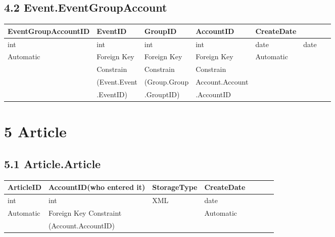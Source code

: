 \documentclass[12pt,fleqn]{article}
\begin{document}
\subsection*{4.2 Event.EventGroupAccount }
\begin{table}[htbp]
\centering
\footnotesize
\label{DB changes}
    \begin{tabular}{|l|l|l|l|l|l|l|} 
        \hline
        EventGroupAccountID & EventID & GroupID & AccountID  &  CreateDate & ~\\ \hline
        int & int & int & int & date & date & ~\\ \hline
        Automatic & Foreign Key & Foreign Key &  Foreign Key  &  Automatic & ~ \\
        ~ & Constrain & Constrain &  Constrain & ~  & ~  & ~ \\  
        ~ &  (Event.Event & (Group.Group & Account.Account  & ~ & ~ & ~ \\ 
        ~ &  .EventID) & .GrouptID) & .AccountID  & ~ & ~ & ~ \\ 
        \hline  
    \end{tabular}
\end{table}
\FloatBarrier
\newpage
\section* {5 Article}
\subsection*{5.1 Article.Article}
\begin{table}[htbp]
\centering
\footnotesize
\label{DB changes}
    \begin{tabular}{|l|l|l|l|l|l|l|} 
        \hline
        ArticleID & AccountID(who entered it) & StorageType & CreateDate & ~\\ \hline
        int & int & XML & date & ~\\ \hline
        Automatic & Foreign Key Constraint & ~ &  Automatic & ~ \\
        ~ & (Account.AccountID) & ~ & ~ & ~ \\
        \hline  
    \end{tabular}
\end{table}
\FloatBarrier
\end{document}
